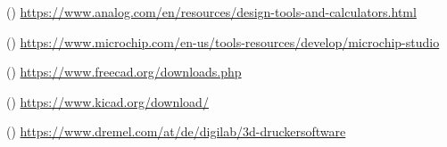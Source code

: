 \begin{table}[!ht]
\begin{threeparttable}
\begin{tablenotes}
      \item[(\thesoftwaretnotecounter)] \url{https://www.analog.com/en/resources/design-tools-and-calculators.html}
\fi
\ifsoftwarepagemicrochipstudio
      \item[(\thesoftwaretnotecounter)] \url{https://www.microchip.com/en-us/tools-resources/develop/microchip-studio}
\fi
\ifsoftwarepagefreecad
      \item[(\thesoftwaretnotecounter)] \url{https://www.freecad.org/downloads.php}
\fi
\ifsoftwarepagekicad
      \item[(\thesoftwaretnotecounter)] \url{https://www.kicad.org/download/}
\fi
\ifsoftwarepagedremeldigilabslicer
      \item[(\thesoftwaretnotecounter)] \url{https://www.dremel.com/at/de/digilab/3d-druckersoftware}  
\fi
    \end{tablenotes}
  \end{threeparttable}
\end{table}